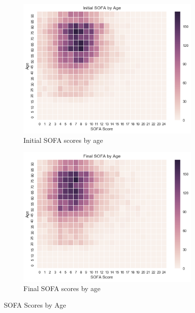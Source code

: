 \documentclass[letterpaper]{article}
\begin{document}
\begin{figure}[H]
  \centering
  \begin{subfigure}{0.4\linewidth}
  \centering
  	\includegraphics[width=1.0\linewidth]{figures/init_SOFA.png} %
  	\caption{Initial SOFA scores by age}
  	\label{fig:init_SOFA}
  \end{subfigure}%
  \begin{subfigure}{0.4\linewidth}
  \centering
  	\includegraphics[width=1.0\linewidth]{figures/fin_SOFA.png}\hfill
  	\caption{Final SOFA scores by age}
  	\label{fig:fin_SOFA}
  \end{subfigure}
  \caption{SOFA Scores by Age}
  \label{fig:SOFA}
\end{figure}
\end{document}
